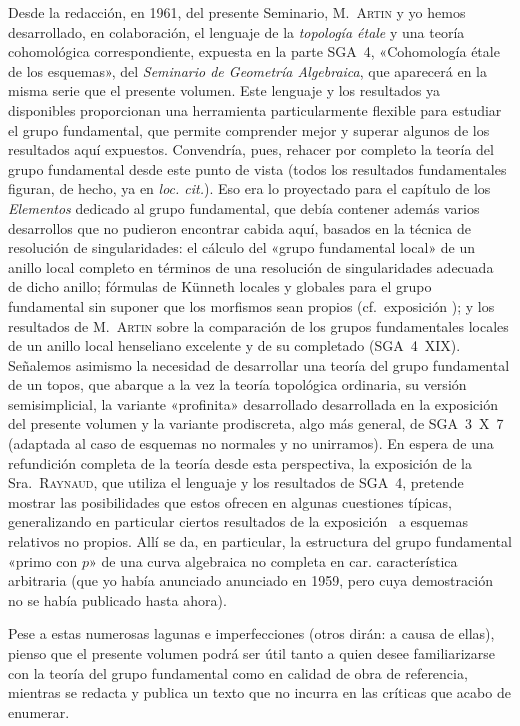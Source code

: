 Desde la redacción, en 1961, del presente Seminario, M.\ \textsc{Artin} y yo hemos desarrollado, en colaboración, el lenguaje de la \emph{topología étale} y una teoría cohomológica correspondiente, expuesta en la parte SGA~4, «Cohomología étale de los esquemas», del \emph{Seminario de Geometría Algebraica}, que aparecerá en la misma serie que el presente volumen. Este lenguaje y los resultados ya disponibles proporcionan una herramienta particularmente flexible para estudiar el grupo fundamental, que permite comprender mejor y superar algunos de los resultados aquí expuestos. Convendría, pues, rehacer por completo la teoría del grupo fundamental desde este punto de vista (todos los resultados fundamentales figuran, de hecho, ya en \emph{loc. cit.}). Eso era lo proyectado para el capítulo de los \emph{Elementos} dedicado al grupo fundamental, que debía contener además varios desarrollos que no pudieron encontrar cabida aquí, basados en la técnica de resolución de singularidades: el cálculo del «grupo fundamental local» de un anillo local completo en términos de una resolución de singularidades adecuada de dicho anillo; fórmulas de Künneth locales y globales para el grupo fundamental sin suponer que los morfismos sean propios (cf.\ exposición ); y los resultados de M.\ \textsc{Artin} sobre la comparación de los grupos fundamentales locales de un anillo local henseliano excelente y de su completado (SGA~4~XIX). Señalemos asimismo la necesidad de desarrollar una teoría del grupo fundamental de un topos, que abarque a la vez la teoría topológica ordinaria, su versión semisimplicial, la variante «profinita»
{desarrollado}
{desarrollada}
en la exposición~ del presente volumen y la variante prodiscreta, algo más general, de SGA~3~X~7 (adaptada al caso de esquemas no normales y no unirramos). En espera de una refundición completa de la teoría desde esta perspectiva, la exposición  de la Sra.\ \textsc{Raynaud}, que utiliza el lenguaje y los resultados de SGA~4, pretende mostrar las posibilidades que estos ofrecen en algunas cuestiones típicas, generalizando en particular ciertos resultados de la exposición~ a esquemas relativos no propios. Allí se da, en particular, la estructura del grupo fundamental «primo con $p$» de una curva algebraica no completa en
{car.}
{característica}
arbitraria (que yo había
{anunciado}
{anunciado}
en 1959, pero cuya demostración no se había publicado hasta ahora).

Pese a estas numerosas lagunas e imperfecciones (otros dirán: a causa de ellas), pienso que el presente volumen podrá ser útil tanto a quien desee familiarizarse con la teoría del grupo fundamental como en calidad de obra de referencia, mientras se redacta y publica un texto que no incurra en las críticas que acabo de enumerar.
